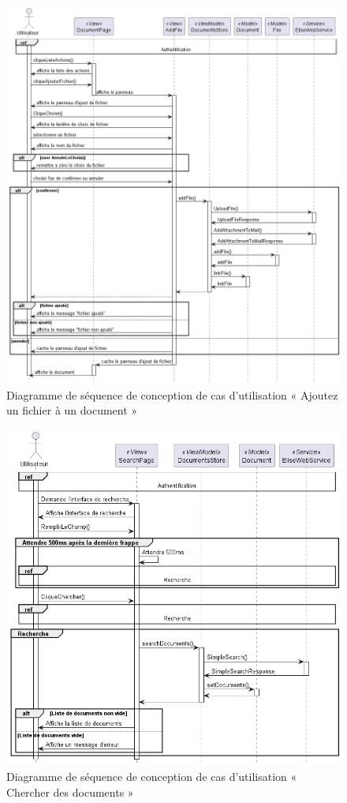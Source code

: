 \begin{figure}[H]
  \centering
  \includegraphics[width=1\textwidth]{out/diagrams/documents/sequence_add_file/sequence_add_file}
  \caption{Diagramme de séquence de conception de cas d'utilisation « Ajoutez un fichier à un document »}
  \label{fig:sequence_conception_addFile}
\end{figure}
\begin{figure}[H]
  \centering
  \includegraphics[width=1\textwidth]{out/diagrams/documents/sequence_chercher/sequence_chercher}
  \caption{Diagramme de séquence de conception de cas d'utilisation « Chercher des documents »}
  \label{fig:sequence_conception_charcherDocument}
\end{figure}


